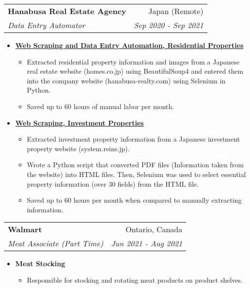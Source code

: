 \documentclass[letterpaper,11pt]{article}
\makeatletter
\newcommand{\resumeItem}[2]{
  \item\small{
    \textbf{#1}{ #2 \vspace{-2pt}}
  }
}
\newcommand{\resumeSubheading}[4]{
  \vspace{-1pt}\item
    \begin{tabular*}{0.97\textwidth}{l@{\extracolsep{\fill}}r}
      \textbf{#1} & #2 \\
      \textit{\small#3} & \textit{\small #4} \\
    \end{tabular*}\vspace{-5pt}
}
\newcommand{\resumeItemListStart}{\begin{itemize}}
\newcommand{\resumeItemListEnd}{\end{itemize}\vspace{-5pt}}
\makeatother
\begin{document}
    \resumeSubheading
      {Hanabusa Real Estate Agency}{Japan (Remote)}
      {Data Entry Automator}{Sep 2020 - Sep 2021}
      \resumeItemListStart
        \resumeItem{\href{https://github.com/pl3lee/Hanabusa-Automation}{Web Scraping and Data Entry Automation, Residential Properties}}
        {\begin{itemize}
            \item Extracted residential property information and images from a Japanese real estate website (homes.co.jp) using BeautifulSoup4 and entered them into the company website (hanabusa-realty.com) using Selenium in Python.
            \item Saved up to 60 hours of manual labor per month.
        \end{itemize}}
        \resumeItem{\href{https://github.com/pl3lee/Reins-Automation}{Web Scraping, Investment Properties}}
        {\begin{itemize}
            \item Extracted investment property information from a Japanese investment property website (system.reins.jp).
            \item Wrote a Python script that converted PDF files (Information taken from the website) into HTML files. Then, Selenium was used to select essential property information (over 30 fields) from the HTML file.
            \item Saved up to 60 hours per month when compared to manually extracting information.
        \end{itemize}}
      \resumeItemListEnd

    \resumeSubheading
      {Walmart}{Ontario, Canada}
      {Meat Associate (Part Time)}{Jun 2021 - Aug 2021}
      \resumeItemListStart
        \resumeItem{Meat Stocking}
          {\begin{itemize}
            \item Responsible for stocking and rotating meat products on product shelves.
          \end{itemize}}
      \resumeItemListEnd
\end{document}
